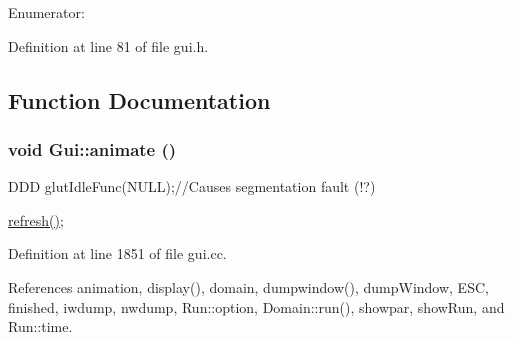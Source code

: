\begin{Desc}
\item[Enumerator: ]\par
\begin{description}
\item[{\em 
\hypertarget{namespaceGui_6fef08ea87190324ff605e26b49552a389c37bfa1a2dcd397816581697289c9e}{
gridlines}
\label{namespaceGui_6fef08ea87190324ff605e26b49552a389c37bfa1a2dcd397816581697289c9e}
}]\item[{\em 
\hypertarget{namespaceGui_6fef08ea87190324ff605e26b49552a39291c3e9f7c0474ca010c12033d49306}{
solidsurface}
\label{namespaceGui_6fef08ea87190324ff605e26b49552a39291c3e9f7c0474ca010c12033d49306}
}]\item[{\em 
\hypertarget{namespaceGui_6fef08ea87190324ff605e26b49552a31bd3eba675110cb7cd711a4ecd20c2ed}{
maxsurfdisptypes}
\label{namespaceGui_6fef08ea87190324ff605e26b49552a31bd3eba675110cb7cd711a4ecd20c2ed}
}]\end{description}
\end{Desc}



Definition at line 81 of file gui.h.

\subsection{Function Documentation}
\hypertarget{namespaceGui_bc885686e998a79d9c98f86c678d6e69}{
\subsubsection[{animate}]{\setlength{\rightskip}{0pt plus 5cm}void Gui::animate ()}}
\label{namespaceGui_bc885686e998a79d9c98f86c678d6e69}




DDD glutIdleFunc(NULL);//Causes segmentation fault (!?)

\hyperlink{namespaceGui_5b94ce6e857635065a0c2053b95529b5}{refresh()}; 

Definition at line 1851 of file gui.cc.

References animation, display(), domain, dumpwindow(), dumpWindow, ESC, finished, iwdump, nwdump, Run::option, Domain::run(), showpar, showRun, and Run::time.

